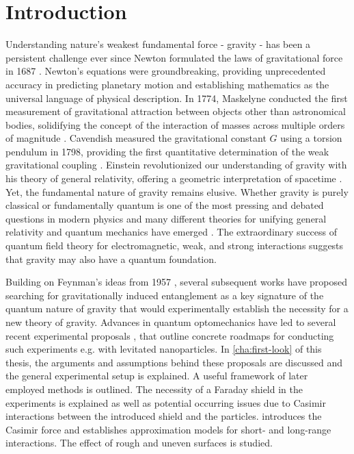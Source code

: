 \chapter{Introduction}\label{cha:introduction}

Understanding nature's weakest fundamental force - gravity - has been a persistent challenge ever since Newton formulated the laws of gravitational force in 1687 \cite{Newton_1687}.
Newton's equations were groundbreaking, providing unprecedented accuracy in predicting planetary motion and establishing mathematics as the universal language of physical description.
In 1774, Maskelyne conducted the first measurement of gravitational attraction between objects other than astronomical bodies, solidifying the concept of the interaction of masses across multiple orders of magnitude \cite{Maskelyne_1775,Davies_1985}. 
Cavendish measured the gravitational constant $G$ using a torsion pendulum in 1798, providing the first quantitative determination of the weak gravitational coupling \cite{Cavendish_1798}.
Einstein revolutionized our understanding of gravity with his theory of general relativity, offering a geometric interpretation of spacetime \cite{Einstein_1916}. Yet, the fundamental nature of gravity remains elusive. Whether gravity is purely classical or fundamentally quantum is one of the most pressing and debated questions in modern physics and many different theories for unifying general relativity and quantum mechanics have emerged \cite{Becker_2007, Ashtekar_1986, Oppenheim_2023}.
The extraordinary success of quantum field theory for electromagnetic, weak, and strong interactions suggests that gravity may also have a quantum foundation.

Building on Feynman's ideas from 1957 \cite{Rickles_2011,Zeh_2011}, several subsequent works \cite{Lindner_2005,Kafri_2013,Schmoele_2016,Krisnanda_2017} have proposed searching for gravitationally induced entanglement as a key signature of the quantum nature of gravity that would experimentally establish the necessity for a new theory of gravity.
Advances in quantum optomechanics have led to several recent experimental proposals \cite{Bose_2017,Marletto_2017,Krisnanda_2020}, that outline concrete roadmaps for conducting such experiments e.g. with levitated nanoparticles.
In \cref{cha:first-look} of this thesis, the arguments and assumptions behind these proposals are discussed and the general experimental setup is explained. A useful framework of later employed methods is outlined.
The necessity of a Faraday shield in the experiments is explained as well as potential occurring issues due to Casimir interactions \cite{Casimir_1948} between the introduced shield and the particles.
 introduces the Casimir force and establishes approximation models for short- and long-range interactions. The effect of rough and uneven surfaces is studied.

